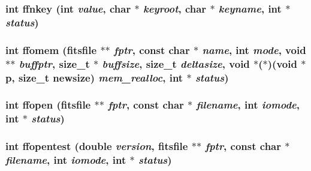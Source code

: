\subsubsection{\setlength{\rightskip}{0pt plus 5cm}int ffnkey (int {\em value}, char $\ast$ {\em keyroot}, char $\ast$ {\em keyname}, int $\ast$ {\em status})}\label{test_2shm__client_2fitsio_8h_246d87f69e3a02a1105b9013ca8f4409}


\subsubsection{\setlength{\rightskip}{0pt plus 5cm}int ffomem (\bf{fitsfile} $\ast$$\ast$ {\em fptr}, const char $\ast$ {\em name}, int {\em mode}, void $\ast$$\ast$ {\em buffptr}, size\_\-t $\ast$ {\em buffsize}, size\_\-t {\em deltasize}, void $\ast$($\ast$)(void $\ast$p, size\_\-t newsize) {\em mem\_\-realloc}, int $\ast$ {\em status})}\label{test_2shm__client_2fitsio_8h_d76715975f2022594bbce821ab9d5d81}


\subsubsection{\setlength{\rightskip}{0pt plus 5cm}int ffopen (\bf{fitsfile} $\ast$$\ast$ {\em fptr}, const char $\ast$ {\em filename}, int {\em iomode}, int $\ast$ {\em status})}\label{test_2shm__client_2fitsio_8h_c42982e168064c85aefcc72de41d1ce9}


\subsubsection{\setlength{\rightskip}{0pt plus 5cm}int ffopentest (double {\em version}, \bf{fitsfile} $\ast$$\ast$ {\em fptr}, const char $\ast$ {\em filename}, int {\em iomode}, int $\ast$ {\em status})}\label{test_2shm__client_2fitsio_8h_9c71ba8e466791b2eac6de1ca9848f4c}


